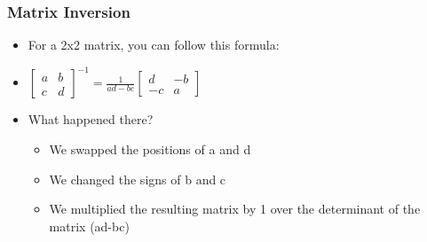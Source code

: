  \begin{frame}[fragile] \frametitle{Matrix Inversion}
\begin{itemize}
\item For a 2x2 matrix, you can follow this formula:
\item $\begin{bmatrix}a & b\\c & d\end{bmatrix}^{-1} = \frac{1}{ad-bc}  \begin{bmatrix}d & -b\\-c & a\end{bmatrix}$
\item What happened there?
\begin{itemize}

\item We swapped the positions of a and d
\item We changed the signs of b and c
\item We multiplied the resulting matrix by 1 over the determinant of the matrix (ad-bc)
\end{itemize}

\end{itemize}
\end{frame}

